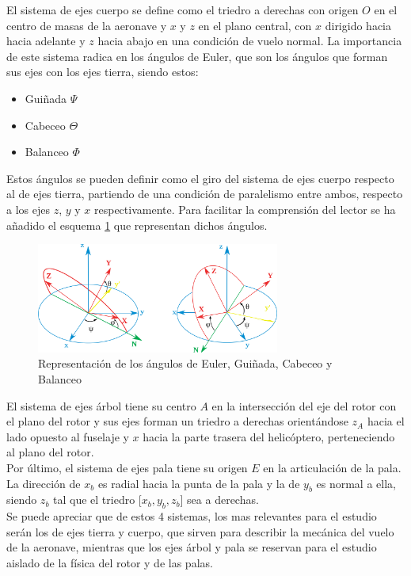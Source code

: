El sistema de ejes cuerpo se define como el triedro a derechas con origen $O$ en el centro de masas de la aeronave y $x$ y $z$ en el plano central, con $x$ dirigido hacia hacia adelante y $z$ hacia abajo en una condición de vuelo normal. La importancia de este sistema radica en los ángulos de Euler, que son los ángulos que forman sus ejes con los ejes tierra, siendo estos:
\begin{itemize}
	\item Guiñada $\Psi$
	\item Cabeceo $\Theta$
	\item Balanceo $\Phi$
\end{itemize}
Estos ángulos se pueden definir como el giro del sistema de ejes cuerpo respecto al de ejes tierra, partiendo de una condición de paralelismo entre ambos, respecto a los ejes $z$, $y$ y $x$ respectivamente. Para facilitar la comprensión del lector se ha añadido el esquema \ref{AEuler} que representan dichos ángulos.\\
\begin{figure}
	\centering
	\includegraphics[width=80mm]{imagenes/AEuler}
	\caption{Representación de los ángulos de Euler, Guiñada, Cabeceo y Balanceo}
	\label{AEuler}
\end{figure}
El sistema de ejes árbol tiene su centro $A$ en la intersección del eje del rotor con el plano del rotor y sus ejes forman un triedro a derechas orientándose $z_{A}$ hacia el lado opuesto al fuselaje y $x$ hacia la parte trasera del helicóptero, perteneciendo al plano del rotor.\\

Por último, el sistema de ejes pala tiene su origen $E$ en la articulación de la pala. La dirección de $x_{b}$ es radial hacia la punta de la pala y la de $y_{b}$ es normal a ella, siendo $z_{b}$ tal que el triedro [$x_{b},y_{b},z_{b}$] sea a derechas.\\

Se puede apreciar que de estos 4 sistemas, los mas relevantes para el estudio serán los de ejes tierra y cuerpo, que sirven para describir la mecánica del vuelo de la aeronave, mientras que los ejes árbol y pala se reservan para el estudio aislado de la física del rotor y de las palas.\\

